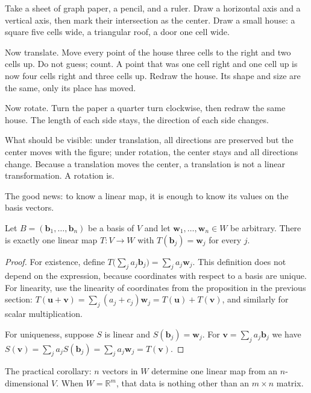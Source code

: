 \begin{tangan}
Take a sheet of graph paper, a pencil, and a ruler. Draw a horizontal axis and a vertical
axis,
then mark their intersection as the center. Draw a small house: a square five cells wide, a
triangular
roof, a door one cell wide.

Now translate. Move every point of the house three cells to the right and two cells up.
Do not guess; count. A point that was one cell right and one cell up
is now
four cells right and three cells up. Redraw the house. Its shape and
size are the same, only its place has moved.

Now rotate. Turn the paper a quarter turn clockwise, then redraw the same
house. The length of each side stays, the direction of each side changes.

What should be visible: under translation, all directions are preserved but the center moves with the figure; under rotation, the center stays and all directions change. Because a translation moves the center, a translation is
not
a linear transformation. A rotation is.
\end{tangan}

The good news: to know a linear map, it is enough to know its values on the basis vectors.

\begin{proposisi}
Let $B=(\mathbf{b}_{1},\dots,\mathbf{b}_{n})$ be a basis of $V$ and let
$\mathbf{w}_{1},\dots,\mathbf{w}_{n}\in W$ be arbitrary. There is exactly one linear map
$T\colon V\to W$ with $T(\mathbf{b}_{j})=\mathbf{w}_{j}$ for every $j$.
\end{proposisi}

\begin{proof}
For existence, define
$T\bigl(\sum_{j}a_{j}\mathbf{b}_{j}\bigr)=\sum_{j}a_{j}\mathbf{w}_{j}$.
This definition does not depend on the expression, because coordinates with respect to a basis
are unique. For linearity, use the linearity of coordinates from the proposition in the
previous section:
$T(\mathbf{u}+\mathbf{v})=\sum_{j}(a_{j}+c_{j})\mathbf{w}_{j}=T(\mathbf{u})+T(\mathbf{v})$,
and similarly for scalar multiplication.

For uniqueness, suppose $S$ is linear and $S(\mathbf{b}_{j})=\mathbf{w}_{j}$. For
$\mathbf{v}=\sum_{j}a_{j}\mathbf{b}_{j}$ we have
$S(\mathbf{v})=\sum_{j}a_{j}S(\mathbf{b}_{j})=\sum_{j}a_{j}\mathbf{w}_{j}=T(\mathbf{v})$.
\end{proof}

The practical corollary: $n$ vectors in $W$ determine one linear map from an $n$-dimensional
$V$.
When $W=\mathbb{R}^{m}$, that data is nothing other than an $m\times n$ matrix.

